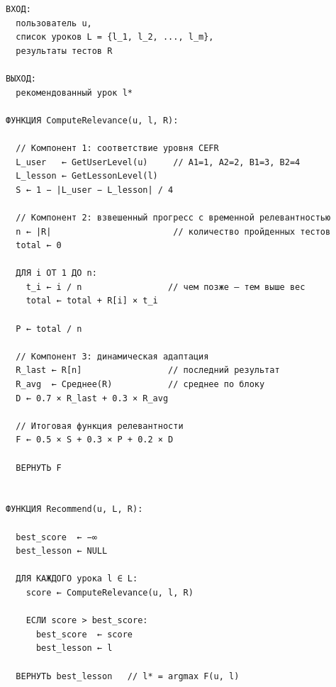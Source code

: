 {\small
\begin{verbatim}
ВХОД:
  пользователь u,
  список уроков L = {l_1, l_2, ..., l_m},
  результаты тестов R

ВЫХОД:
  рекомендованный урок l*

ФУНКЦИЯ ComputeRelevance(u, l, R):

  // Компонент 1: соответствие уровня CEFR
  L_user   ← GetUserLevel(u)     // A1=1, A2=2, B1=3, B2=4
  L_lesson ← GetLessonLevel(l)
  S ← 1 − |L_user − L_lesson| / 4

  // Компонент 2: взвешенный прогресс с временной релевантностью
  n ← |R|                        // количество пройденных тестов
  total ← 0

  ДЛЯ i ОТ 1 ДО n:
    t_i ← i / n                 // чем позже — тем выше вес
    total ← total + R[i] × t_i

  P ← total / n

  // Компонент 3: динамическая адаптация
  R_last ← R[n]                 // последний результат
  R_avg  ← Среднее(R)           // среднее по блоку
  D ← 0.7 × R_last + 0.3 × R_avg

  // Итоговая функция релевантности
  F ← 0.5 × S + 0.3 × P + 0.2 × D

  ВЕРНУТЬ F


ФУНКЦИЯ Recommend(u, L, R):

  best_score  ← −∞
  best_lesson ← NULL

  ДЛЯ КАЖДОГО урока l ∈ L:
    score ← ComputeRelevance(u, l, R)

    ЕСЛИ score > best_score:
      best_score  ← score
      best_lesson ← l

  ВЕРНУТЬ best_lesson   // l* = argmax F(u, l)
\end{verbatim}
}

